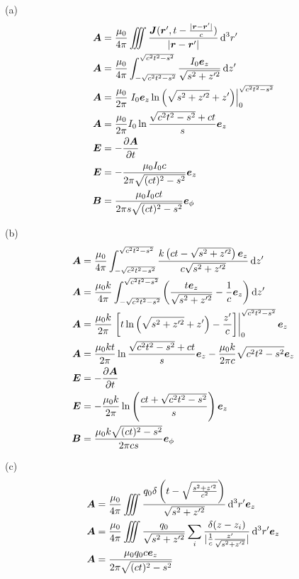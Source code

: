 (a)\begin{align*}
    \boldsymbol{A}&=\frac{\mu_0}{4\pi}\iiint\frac{\boldsymbol{J}(\boldsymbol{r}', t-\frac{\vert{}\boldsymbol{r} - \boldsymbol{r}'\vert{}}{c})}{\vert{}\boldsymbol{r} - \boldsymbol{r}'\vert{}}\dif ^3r'\\
    \boldsymbol{A}&=\frac{\mu_0}{4\pi}\int_{-\sqrt{c^2t^2-s^2}}^{\sqrt{c^2t^2-s^2}}\frac{I_0\boldsymbol{e}_z}{\sqrt{s^2+z'^2}}\dif z'\\
    \boldsymbol{A}&=\frac{\mu_0}{2\pi}\left.I_0\boldsymbol{e}_z\ln\left(\sqrt{s^2+z'^2}+z'\right)\right|_{0}^{\sqrt{c^2t^2-s^2}}\\
    \boldsymbol{A}&=\frac{\mu_0}{2\pi}I_0\ln\frac{\sqrt{c^2t^2-s^2}+ct}{s}\boldsymbol{e}_z\\
    \boldsymbol{E}&=-\frac{\partial\boldsymbol{A}}{\partial t}\\
    \boldsymbol{E}& = -\frac{\mu_0 I_0 c}{2\pi \sqrt{(ct)^2 - s^2}} \boldsymbol{e}_z\\
    \boldsymbol{B}&= \frac{\mu_0 I_0 c t}{2\pi s \sqrt{(ct)^2 - s^2}} \boldsymbol{e}_\phi
\end{align*}

(b)\begin{align*}
    \boldsymbol{A}&=\frac{\mu_0}{4\pi}\int_{-\sqrt{c^2t^2-s^2}}^{\sqrt{c^2t^2-s^2}}\frac{k\left(ct-\sqrt{s^2+z'^2}\right)\boldsymbol{e}_z}{c\sqrt{s^2+z'^2}}\dif z'\\
    \boldsymbol{A}&=\frac{\mu_0k}{4\pi}\int_{-\sqrt{c^2t^2-s^2}}^{\sqrt{c^2t^2-s^2}}\left(\frac{t\boldsymbol{e}_z}{\sqrt{s^2+z'^2}}
    -\frac1c\boldsymbol{e}_z\right)\dif z'\\
    \boldsymbol{A}&=\frac{\mu_0k}{2\pi}\left.\left[t\ln\left(\sqrt{s^2+z'^2}+z'\right)-\frac {z'}c\right]\right|_{0}^{\sqrt{c^2t^2-s^2}}\boldsymbol{e}_z\\
    \boldsymbol{A}&=\frac{\mu_0kt}{2\pi}\ln\frac{\sqrt{c^2t^2-s^2}+ct}{s}\boldsymbol{e}_z-\frac{\mu_0k}{2\pi c}\sqrt{c^2t^2-s^2}\boldsymbol{e}_z\\
    \boldsymbol{E}&=-\frac{\partial\boldsymbol{A}}{\partial t}\\
    \boldsymbol{E}&= -\frac{\mu_0 k}{2\pi} \ln\left( \frac{ct + \sqrt{c^2t^2 - s^2}}{s} \right) \boldsymbol{e}_z\\
    \boldsymbol{B}&= \frac{\mu_0 k \sqrt{(ct)^2 - s^2}}{2\pi c s} \boldsymbol{e}_{\phi}
\end{align*}

(c)\begin{align*}
    \boldsymbol{A}&=\frac{\mu_0}{4\pi}\iiint\frac{q_0\delta\left(t-\sqrt{\frac{s^2+z'^2}{c^2}}\right)}{\sqrt{s^2+z'^2}}\dif ^3r'\boldsymbol{e}_z\\
    \boldsymbol{A}&=\frac{\mu_0}{4\pi}\iiint\frac{q_0}{\sqrt{s^2+z'^2}} \sum_{i} \frac{\delta(z - z_i)}{\vert{}\frac{1}{c} \frac{z'}{\sqrt{s^2 + z'^2}}\vert{}}\dif ^3r'\boldsymbol{e}_z\\
    \boldsymbol{A} &= \frac{\mu_0 q_0 c\boldsymbol{e}_z}{2\pi \sqrt{(ct)^2 - s^2}}
\end{align*}

